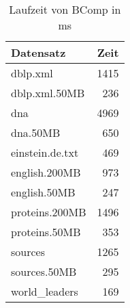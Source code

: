 \documentclass[10pt,a4paper]{article}
\begin{document}
	
	
	\begin{table}\centering
		\begin{tabular}{l|r}
			Datensatz & Zeit \\ \hline
          dblp.xml & 1415 \\
     dblp.xml.50MB &  236 \\
               dna & 4969 \\
          dna.50MB &  650 \\
   einstein.de.txt &  469 \\
     english.200MB &  973 \\
      english.50MB &  247 \\
    proteins.200MB & 1496 \\
     proteins.50MB &  353 \\
           sources & 1265 \\
      sources.50MB &  295 \\
    world\_leaders &  169 \\
		\end{tabular}
		\caption{Laufzeit von BComp in ms}
	\end{table}
\end{document}
